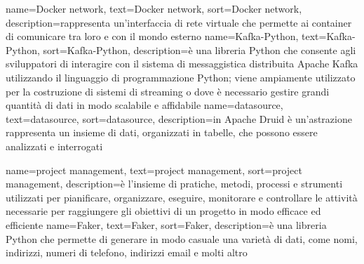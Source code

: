 {
    name={Docker network},
    text=Docker network,
    sort=Docker network,
    description={rappresenta un'interfaccia di rete virtuale che permette ai container di comunicare tra loro e con il mondo esterno}
}
{
    name={Kafka-Python},
    text=Kafka-Python,
    sort=Kafka-Python,
    description={è una libreria Python che consente agli sviluppatori di interagire con il sistema di messaggistica distribuita Apache Kafka utilizzando il linguaggio di programmazione Python; viene ampiamente utilizzato per la costruzione di sistemi di streaming o dove è necessario gestire grandi quantità di dati in modo scalabile e affidabile}
}
{
    name={datasource},
    text=datasource,
    sort=datasource,
    description={in Apache Druid è un'astrazione rappresenta un insieme di dati, organizzati in tabelle, che possono essere analizzati e interrogati}
}

{
    name={project management},
    text=project management,
    sort=project management,
    description={è l'insieme di pratiche, metodi, processi e strumenti utilizzati per pianificare, organizzare, eseguire, monitorare e controllare le attività necessarie per raggiungere gli obiettivi di un progetto in modo efficace ed efficiente}
}
{
    name={Faker},
    text=Faker,
    sort=Faker,
    description={è una libreria Python che permette di generare in modo casuale una varietà di dati, come nomi, indirizzi, numeri di telefono, indirizzi email e molti altro}
}